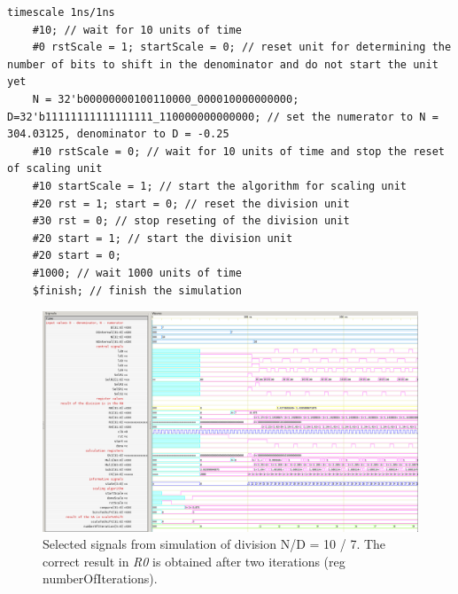\documentclass[a4paper, twoside, 11pt]{article}
\begin{document}
\begin{lstlisting}[language={pseudocode}, caption={Pseudocode snippet for the Verilog simulation test bench.}, label= {lst:division-testbench-verilog-pseudocode}]
    timescale 1ns/1ns 
    #10; // wait for 10 units of time
    #0 rstScale = 1; startScale = 0; // reset unit for determining the number of bits to shift in the denominator and do not start the unit yet
    N = 32'b00000000100110000_000010000000000; D=32'b11111111111111111_110000000000000; // set the numerator to N = 304.03125, denominator to D = -0.25
    #10 rstScale = 0; // wait for 10 units of time and stop the reset of scaling unit
    #10 startScale = 1; // start the algorithm for scaling unit
    #20 rst = 1; start = 0; // reset the division unit
    #30 rst = 0; // stop reseting of the division unit
    #20 start = 1; // start the division unit
    #20 start = 0;
    #1000; // wait 1000 units of time
    $finish; // finish the simulation
\end{lstlisting}

\begin{figure}[htbp!]
  \centering
  \includegraphics[width=1\textwidth]{src/png/inverted/division-10-div-7.png}
    \caption{Selected signals from simulation of division N/D = 10 / 7. The correct result in \textit{R0} is obtained after two iterations (reg numberOfIterations).}
  \label{fig:division-10-div-7}
\end{figure}
\end{document}
